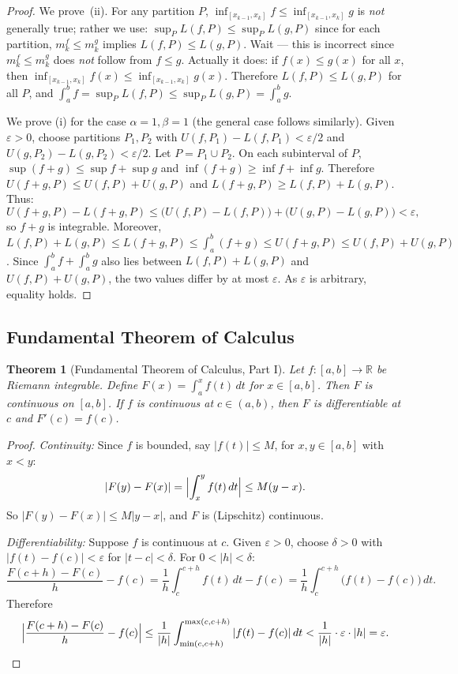 \documentclass[11pt,a4paper]{article}
\theoremstyle{definition}
\theoremstyle{plain}
\newtheorem{theorem}{Theorem}[section]
\theoremstyle{remark}
\newcommand{\R}{\mathbb{R}}
\begin{document}
\begin{proof}
We prove~(ii). For any partition $P$,
$\inf_{[x_{k-1}, x_k]} f \le \inf_{[x_{k-1}, x_k]} g$ is \emph{not} generally
true; rather we use: $\sup_P L(f, P) \le \sup_P L(g, P)$ since for each partition,
$m_k^f \le m_k^g$ implies $L(f, P) \le L(g, P)$. Wait --- this is incorrect since
$m_k^f \le m_k^g$ does \emph{not} follow from $f \le g$. Actually it does: if
$f(x) \le g(x)$ for all $x$, then $\inf_{[x_{k-1},x_k]} f(x) \le
\inf_{[x_{k-1},x_k]} g(x)$. Therefore $L(f,P) \le L(g,P)$ for all $P$, and
$\int_a^b f = \sup_P L(f,P) \le \sup_P L(g,P) = \int_a^b g$.

We prove (i) for the case $\alpha = 1, \beta = 1$ (the general case follows
similarly). Given $\varepsilon > 0$, choose partitions $P_1, P_2$ with
$U(f, P_1) - L(f, P_1) < \varepsilon/2$ and $U(g, P_2) - L(g, P_2) < \varepsilon/2$.
Let $P = P_1 \cup P_2$. On each subinterval of $P$,
$\sup(f + g) \le \sup f + \sup g$ and $\inf(f + g) \ge \inf f + \inf g$. Therefore
$U(f+g, P) \le U(f, P) + U(g, P)$ and $L(f+g, P) \ge L(f, P) + L(g, P)$.
Thus:
\[
U(f+g, P) - L(f+g, P) \le \bigl(U(f,P) - L(f,P)\bigr) + \bigl(U(g,P) - L(g,P)\bigr)
< \varepsilon,
\]
so $f + g$ is integrable. Moreover, $L(f,P) + L(g,P) \le L(f+g,P) \le
\int_a^b(f+g) \le U(f+g,P) \le U(f,P) + U(g,P)$. Since
$\int_a^b f + \int_a^b g$ also lies between $L(f,P) + L(g,P)$ and
$U(f,P) + U(g,P)$, the two values differ by at most $\varepsilon$.
As $\varepsilon$ is arbitrary, equality holds.
\end{proof}

\subsection{Fundamental Theorem of Calculus}
\label{subsec:ftc}

\begin{theorem}[Fundamental Theorem of Calculus, Part I]
\label{thm:ftc1}
Let $f : [a, b] \to \R$ be Riemann integrable. Define
$F(x) = \int_a^x f(t)\,dt$ for $x \in [a, b]$. Then $F$ is continuous on $[a, b]$.
If $f$ is continuous at $c \in (a, b)$, then $F$ is differentiable at $c$ and
$F'(c) = f(c)$.
\end{theorem}

\begin{proof}
\emph{Continuity:} Since $f$ is bounded, say $|f(t)| \le M$, for $x, y \in [a, b]$
with $x < y$:
\[
|F(y) - F(x)| = \Bigl|\int_x^y f(t)\,dt\Bigr| \le M(y - x).
\]
So $|F(y) - F(x)| \le M|y - x|$, and $F$ is (Lipschitz) continuous.

\emph{Differentiability:} Suppose $f$ is continuous at $c$. Given
$\varepsilon > 0$, choose $\delta > 0$ with $|f(t) - f(c)| < \varepsilon$ for
$|t - c| < \delta$. For $0 < |h| < \delta$:
\[
\frac{F(c+h) - F(c)}{h} - f(c)
= \frac{1}{h}\int_c^{c+h} f(t)\,dt - f(c)
= \frac{1}{h}\int_c^{c+h} \bigl(f(t) - f(c)\bigr)\,dt.
\]
Therefore
\[
\Bigl|\frac{F(c+h) - F(c)}{h} - f(c)\Bigr|
\le \frac{1}{|h|}\int_{\min(c,c+h)}^{\max(c,c+h)} |f(t) - f(c)|\,dt
< \frac{1}{|h|} \cdot \varepsilon \cdot |h| = \varepsilon. \qedhere
\]
\end{proof}
\end{document}
